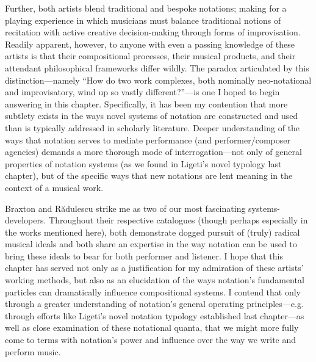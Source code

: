     Further, both artists blend traditional and bespoke notations; making for a playing experience in which musicians must balance traditional notions of recitation with active creative decision-making through forms of improvisation. Readily apparent, however, to anyone with even a passing knowledge of these artists is that their compositional processes, their musical products, and their attendant philosophical frameworks differ wildly. The paradox articulated by this distinction---namely ``How do two work complexes, both nominally neo-notational and improvisatory, wind up so vastly different?''---is one I hoped to begin answering in this chapter. Specifically, it has been my contention that more subtlety exists in the ways novel systems of notation are constructed and used than is typically addressed in scholarly literature. Deeper understanding of the ways that notation serves to mediate performance (and performer/composer agencies) demands a more thorough mode of interrogation---not only of general properties of notation systems (as we found in Ligeti's novel typology last chapter), but of the specific ways that new notations are lent meaning in the context of a musical work. 

    Braxton and R\u{a}dulescu strike me as two of our most fascinating systems-developers. Throughout their respective catalogues (though perhaps especially in the works mentioned here), both demonstrate dogged pursuit of (truly) radical musical ideals and both share an expertise in the way notation can be used to bring these ideals to bear for both performer and listener. I hope that this chapter has served not only as a justification for my admiration of these artists' working methods, but also as an elucidation of the ways notation's fundamental particles can dramatically influence compositional systems. I contend that only through a greater understanding of notation's general operating principles---e.g. through efforts like Ligeti's novel notation typology established last chapter---as well as close examination of these notational quanta, that we might more fully come to terms with notation's power and influence over the way we write and perform music.


